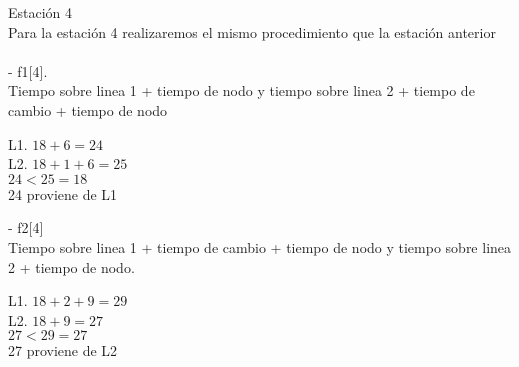 \documentclass[12pt,twoside]{article}
\begin{document}
 Estación 4\\
 Para la estación 4 realizaremos el mismo procedimiento que la estación anterior\\ \\
- f{1}[4]. \\
Tiempo sobre linea 1 + tiempo de nodo y tiempo sobre linea 2 + tiempo de cambio + tiempo de nodo\\
\begin{center}
   L1.  $18 + 6 = 24$\\
   L2.  $18 + 1 + 6 = 25$\\
    $24 < 25 = 18$\\
    24 proviene de L1
\end{center}

- f{2}[4]\\
Tiempo sobre linea 1 + tiempo de cambio + tiempo de nodo y tiempo sobre linea 2 + tiempo de nodo.
\begin{center}
   L1.  $18 + 2 + 9 = 29$\\
   L2.  $18 + 9 = 27$\\
    $27 < 29 = 27$\\
    27 proviene de L2
\end{center}
\end{document}
